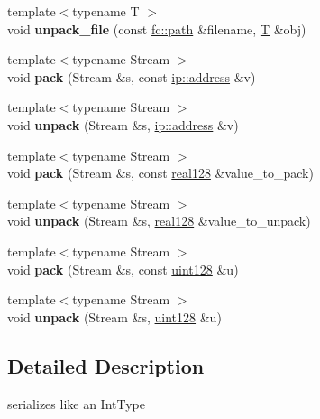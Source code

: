 \begin{DoxyCompactItemize}
\item 
\mbox{\label{namespacefc_1_1raw_a6de96d3d5084498058deb1cef4139ebe}} 
{\footnotesize template$<$typename T $>$ }\\void {\bfseries unpack\+\_\+file} (const \mbox{\hyperlink{classfc_1_1path}{fc\+::path}} \&filename, \mbox{\hyperlink{struct_t}{T}} \&obj)
\item 
\mbox{\label{namespacefc_1_1raw_a7808eeea9b9e3a004c5dbd2b985b5ce1}} 
{\footnotesize template$<$typename Stream $>$ }\\void {\bfseries pack} (Stream \&s, const \mbox{\hyperlink{classfc_1_1ip_1_1address}{ip\+::address}} \&v)
\item 
\mbox{\label{namespacefc_1_1raw_a625b1f92949b048bf6c57808a9767b3d}} 
{\footnotesize template$<$typename Stream $>$ }\\void {\bfseries unpack} (Stream \&s, \mbox{\hyperlink{classfc_1_1ip_1_1address}{ip\+::address}} \&v)
\item 
\mbox{\label{namespacefc_1_1raw_a2e1d77e36260124dbaee9b676929d885}} 
{\footnotesize template$<$typename Stream $>$ }\\void {\bfseries pack} (Stream \&s, const \mbox{\hyperlink{classfc_1_1real128}{real128}} \&value\+\_\+to\+\_\+pack)
\item 
\mbox{\label{namespacefc_1_1raw_a93159491c1c78328b6a639eed2071fff}} 
{\footnotesize template$<$typename Stream $>$ }\\void {\bfseries unpack} (Stream \&s, \mbox{\hyperlink{classfc_1_1real128}{real128}} \&value\+\_\+to\+\_\+unpack)
\item 
\mbox{\label{namespacefc_1_1raw_a76b24aae2797bd14236afbcf48adb0ad}} 
{\footnotesize template$<$typename Stream $>$ }\\void {\bfseries pack} (Stream \&s, const \mbox{\hyperlink{classfc_1_1uint128}{uint128}} \&u)
\item 
\mbox{\label{namespacefc_1_1raw_a826ec952e9b83eef57a1a19b59831c09}} 
{\footnotesize template$<$typename Stream $>$ }\\void {\bfseries unpack} (Stream \&s, \mbox{\hyperlink{classfc_1_1uint128}{uint128}} \&u)
\end{DoxyCompactItemize}


\subsection{Detailed Description}
serializes like an Int\+Type 